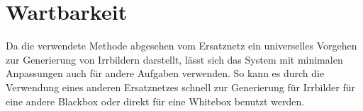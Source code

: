 \section{Wartbarkeit}

Da die verwendete Methode abgesehen vom Ersatznetz ein universelles Vorgehen zur Generierung von Irrbildern darstellt, lässt sich das System mit minimalen Anpassungen auch für andere Aufgaben verwenden. So kann es durch die Verwendung eines anderen Ersatznetzes schnell zur Generierung für Irrbilder für eine andere Blackbox oder direkt für eine Whitebox benutzt werden. 